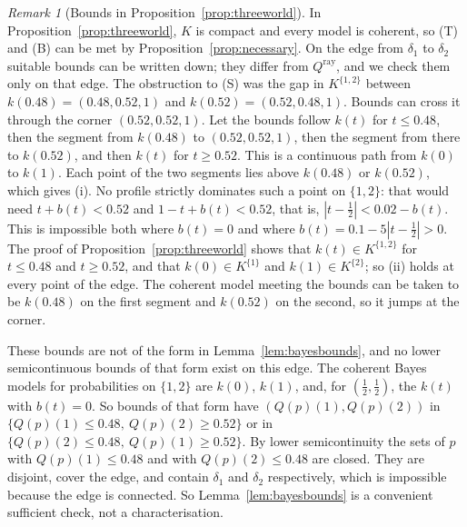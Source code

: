 \documentclass[11pt]{article}
\theoremstyle{definition}
\theoremstyle{remark}
\newtheorem{remark}[theorem]{Remark}
\begin{document}
\begin{remark}[Bounds in Proposition~\ref{prop:threeworld}]\label{rem:threeworld-bounds}
In Proposition~\ref{prop:threeworld}, $K$ is compact and every model is coherent, so (T) and (B) can be met by Proposition~\ref{prop:necessary}. On the edge from $\delta_1$ to $\delta_2$ suitable bounds can be written down; they differ from $Q^{\mathrm{ray}}$, and we check them only on that edge. The obstruction to (S) was the gap in $K^{\{1,2\}}$ between $k(0.48)=(0.48,0.52,1)$ and $k(0.52)=(0.52,0.48,1)$. Bounds can cross it through the corner $(0.52,0.52,1)$. Let the bounds follow $k(t)$ for $t\le0.48$, then the segment from $k(0.48)$ to $(0.52,0.52,1)$, then the segment from there to $k(0.52)$, and then $k(t)$ for $t\ge0.52$. This is a continuous path from $k(0)$ to $k(1)$. Each point of the two segments lies above $k(0.48)$ or $k(0.52)$, which gives (i). No profile strictly dominates such a point on $\{1,2\}$: that would need $t+b(t)<0.52$ and $1-t+b(t)<0.52$, that is, $|t-\tfrac12|<0.02-b(t)$. This is impossible both where $b(t)=0$ and where $b(t)=0.1-5|t-\tfrac12|>0$. The proof of Proposition~\ref{prop:threeworld} shows that $k(t)\in K^{\{1,2\}}$ for $t\le0.48$ and $t\ge0.52$, and that $k(0)\in K^{\{1\}}$ and $k(1)\in K^{\{2\}}$; so (ii) holds at every point of the edge. The coherent model meeting the bounds can be taken to be $k(0.48)$ on the first segment and $k(0.52)$ on the second, so it jumps at the corner.

These bounds are not of the form in Lemma~\ref{lem:bayesbounds}, and no lower semicontinuous bounds of that form exist on this edge. The coherent Bayes models for probabilities on $\{1,2\}$ are $k(0)$, $k(1)$, and, for $(\tfrac12,\tfrac12)$, the $k(t)$ with $b(t)=0$. So bounds of that form have $(Q(p)(1),Q(p)(2))$ in $\{Q(p)(1)\le0.48,\ Q(p)(2)\ge0.52\}$ or in $\{Q(p)(2)\le0.48,\ Q(p)(1)\ge0.52\}$. By lower semicontinuity the sets of $p$ with $Q(p)(1)\le0.48$ and with $Q(p)(2)\le0.48$ are closed. They are disjoint, cover the edge, and contain $\delta_1$ and $\delta_2$ respectively, which is impossible because the edge is connected. So Lemma~\ref{lem:bayesbounds} is a convenient sufficient check, not a characterisation.
\end{remark}
\end{document}
